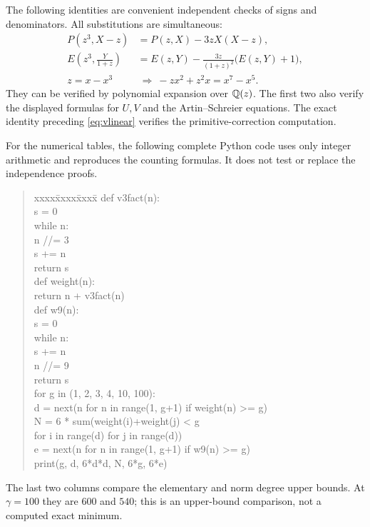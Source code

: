 The following identities are convenient independent checks of signs
and denominators. All substitutions are simultaneous:
\begin{align*}
 P(z^3,X-z)&=P(z,X)-3zX(X-z),\\
 E\left(z^3,\frac{Y}{1+z}\right)
  &=E(z,Y)-\frac{3z}{(1+z)^2}\bigl(E(z,Y)+1\bigr),\\
 z=x-x^3&\ \Longrightarrow\ -zx^2+z^2x=x^7-x^5.
\end{align*}
They can be verified by polynomial expansion over $\mathbb Q(z)$.
The first two also verify the displayed formulas for $U,V$ and the
Artin--Schreier equations. The exact identity preceding
\eqref{eq:vlinear} verifies the primitive-correction computation.

For the numerical tables, the following complete Python code uses only
integer arithmetic and reproduces the counting formulas. It does not
test or replace the independence proofs.
\begin{quote}\begin{minipage}{\linewidth}\small\ttfamily
\begin{tabbing}
xxxx\=xxxx\=xxxx\=\kill
def v3fact(n):\\
\>s = 0\\
\>while n:\\
\>\>n //= 3\\
\>\>s += n\\
\>return s\\
def weight(n):\\
\>return n + v3fact(n)\\
def w9(n):\\
\>s = 0\\
\>while n:\\
\>\>s += n\\
\>\>n //= 9\\
\>return s\\
for g in (1, 2, 3, 4, 10, 100):\\
\>d = next(n for n in range(1, g+1) if weight(n) >= g)\\
\>N = 6 * sum(weight(i)+weight(j) < g\\
\>\>for i in range(d) for j in range(d))\\
\>e = next(n for n in range(1, g+1) if w9(n) >= g)\\
\>print(g, d, 6*d*d, N, 6*g, 6*e)
\end{tabbing}
\end{minipage}\end{quote}
The last two columns compare the elementary and norm degree upper
bounds. At $\gamma=100$ they are $600$ and $540$; this is an upper-bound
comparison, not a computed exact minimum.

